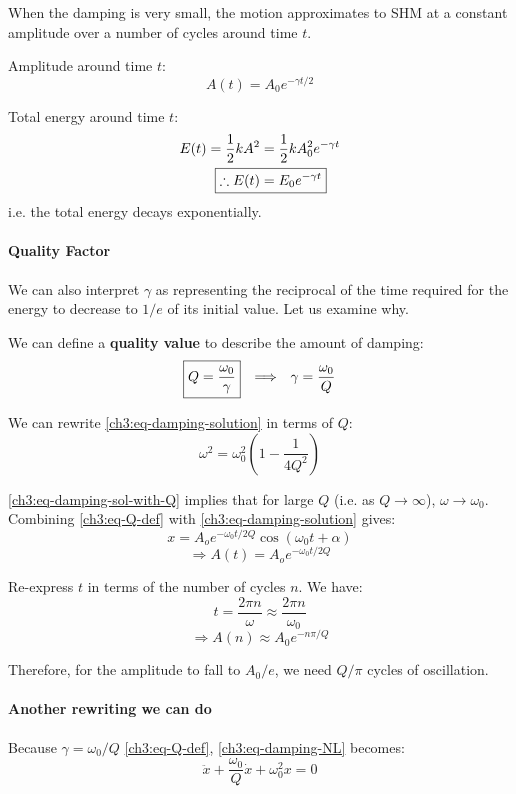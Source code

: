 When the damping is very small, the motion approximates to SHM at a constant amplitude over a number of cycles around time $t$.

Amplitude around time $t$:
\[ A(t) = A_0 e^{-\gamma t/2} \]

Total energy around time $t$:
\begin{align*}
	E(t) = \frac{1}{2}kA^2 
	&= \frac{1}{2}kA_0^2 e^{-\gamma t} \\
	\Aboxed{\therefore E(t) &= E_0 e^{-\gamma t} }
\end{align*}
i.e. the total energy decays exponentially.

\paragraph{Quality Factor} \label{ch3:sec-quality-factor}
We can also interpret $\gamma$ as representing the reciprocal of the time required for the energy to decrease to $1/e$ of its initial value. Let us examine why.

We can define a \textbf{quality value} to describe the amount of damping:
\begin{equation}
	\boxed{Q = \frac{\omega_0}{\gamma}} 
	\hspace{0.25cm}\Longrightarrow\hspace{0.25cm} 
	\gamma = \frac{\omega_0}{Q}
	\label{ch3:eq-Q-def}
\end{equation}

We can rewrite \eqref{ch3:eq-damping-solution} in terms of $Q$:
\begin{equation}
	\omega^2 = \omega_0^2 \left(1- \frac{1}{4Q^2}\right) \label{ch3:eq-damping-sol-with-Q}
\end{equation}

\eqref{ch3:eq-damping-sol-with-Q} implies that for large $Q$ (i.e. as $Q \to \infty$), $\omega \to \omega_0$. 
Combining \eqref{ch3:eq-Q-def} with \eqref{ch3:eq-damping-solution} gives:
\[ x = A_o e^{-\omega_0 t/2Q} \cos(\omega_0 t + \alpha) \]
\[ \Longrightarrow A(t) = A_o e^{-\omega_0 t/2Q} \]

Re-express $t$ in terms of the number of cycles $n$. We have:
\[ t = \frac{2\pi n}{\omega} \approx \frac{2\pi n}{\omega_0} \]
\[ \Longrightarrow A(n) \approx A_0 e^{-n\pi/Q} \]

Therefore, for the amplitude to fall to $A_0/e$, we need $Q/\pi$ cycles of oscillation.

\paragraph{Another rewriting we can do}
Because $\gamma=\omega_0/Q$ \eqref{ch3:eq-Q-def}, \eqref{ch3:eq-damping-NL} becomes:
\[ \boxed{ \ddot{x} + \frac{\omega_0}{Q}\dot{x} + \omega_0^2 x = 0 } \]


